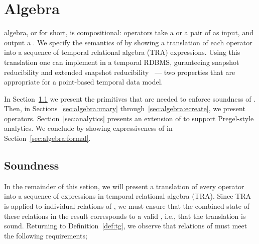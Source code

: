 \section{Algebra}
\label{sec:algebra}
\setlength{\textfloatsep}{5pt}%

\tg algebra, or \tga for short, is compositional: operators take a \tg
or a pair of \tgs as input, and output a \tg.  We specify the
semantics of \tga by showing a translation of each operator into a
sequence of temporal relational algebra (TRA) expressions.  Using this
translation one can implement \tga in a temporal RDBMS, guranteeing
snapshot reducibility and extended snapshot
reducibility~\cite{DBLP:reference/db/Bohlen092} --- two properties
that are appropriate for a point-based temporal data model.

In Section~\ref{sec:algebra:integrity} we present the primitives that
are needed to enforce soundness of \tga.  Then, in
Sections~\ref{sec:algebra:unary} through~\ref{sec:algebra:ecreate}, we
present \tga operators.  Section~\ref{sec:analytics} presents an
extension of \tga to support Pregel-style analytics.  We conclude by
showing expressiveness of \tga in Section~\ref{sec:algebra:formal}.

\subsection{Soundness}
\label{sec:algebra:integrity}

In the remainder of this setion, we will present a translation of
every \tga operator into a sequence of expressions in temporal
relational algebra (TRA).  Since TRA is applied to individual
relations of \tve, we must ensure that the combined state of these
relations in the result corresponds to a valid \tg, i.e., that the
translation is sound.  Returning to Definition~\ref{def:tg}, we
observe that relations of \tve must meet the following requirements;

